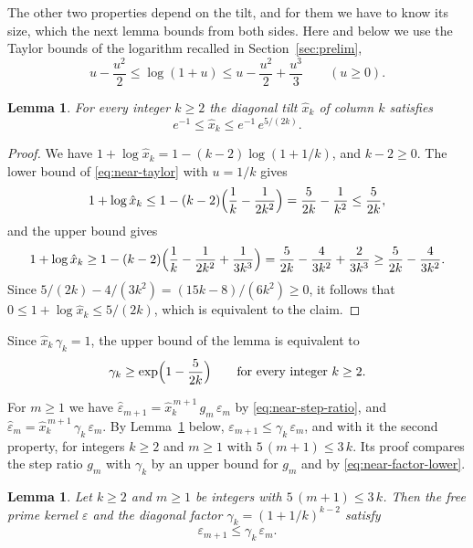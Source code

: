 \documentclass{amsart}
\newtheorem{lemma}[theorem]{Lemma}
\theoremstyle{definition}
\theoremstyle{remark}
\numberwithin{equation}{section}
\begin{document}
The other two properties depend on the tilt, and for them we have to know
its size, which the next lemma bounds from both sides.
Here and below we use the Taylor bounds of the logarithm recalled in
Section~\ref{sec:prelim},
\begin{equation}\label{eq:near-taylor}
u-\frac{u^2}{2}\le\log(1+u)\le u-\frac{u^2}{2}+\frac{u^3}{3}
\qquad(u\ge0).
\end{equation}

\begin{lemma}\label{lem:tiltbounds}
For every integer $k\ge2$ the diagonal tilt $\hat x_k$ of column $k$
satisfies
\[
e^{-1}\le\hat x_k\le e^{-1}\,e^{5/(2k)} .
\]
\end{lemma}

\begin{proof}
We have $1+\log\hat x_k=1-(k-2)\log(1+1/k)$, and $k-2\ge0$. The lower bound
of \eqref{eq:near-taylor} with $u=1/k$ gives
\[
1+\log\hat x_k\le1-(k-2)\Bigl(\frac1k-\frac{1}{2k^2}\Bigr)
=\frac{5}{2k}-\frac{1}{k^2}\le\frac{5}{2k} ,
\]
and the upper bound gives
\[
1+\log\hat x_k\ge1-(k-2)\Bigl(\frac1k-\frac{1}{2k^2}+\frac{1}{3k^3}\Bigr)
=\frac{5}{2k}-\frac{4}{3k^2}+\frac{2}{3k^3}\ge\frac{5}{2k}-\frac{4}{3k^2} .
\]
Since $5/(2k)-4/(3k^2)=(15k-8)/(6k^2)\ge0$, it follows that
$0\le1+\log\hat x_k\le5/(2k)$, which is equivalent to the claim.
\end{proof}

Since $\hat x_k\,\gamma_k=1$, the upper bound
of the lemma is equivalent to
\begin{equation}\label{eq:near-factor-lower}
\gamma_k\ge\exp\Bigl(1-\frac{5}{2k}\Bigr)
\qquad\text{for every integer }k\ge2 .
\end{equation}

For $m\ge1$ we have
$\hat\varepsilon_{m+1}=\hat x_k^{\,m+1}\,g_m\,\varepsilon_m$ by
\eqref{eq:near-step-ratio}, and
$\hat\varepsilon_m=\hat x_k^{\,m+1}\,\gamma_k\,\varepsilon_m$. By
Lemma~\ref{lem:kernelgrowth} below,
$\varepsilon_{m+1}\le\gamma_k\,\varepsilon_m$, and with it the second
property, for integers $k\ge2$ and $m\ge1$ with $5\,(m+1)\le3\,k$. Its proof
compares the step ratio $g_m$ with $\gamma_k$ by an upper bound for $g_m$
and by \eqref{eq:near-factor-lower}.

\begin{lemma}\label{lem:kernelgrowth}
Let $k\ge2$ and $m\ge1$ be integers with $5\,(m+1)\le3\,k$. Then the free
prime kernel $\varepsilon$ and the diagonal factor $\gamma_k=(1+1/k)^{k-2}$
satisfy
\[
\varepsilon_{m+1}\le\gamma_k\,\varepsilon_m .
\]
\end{lemma}
\end{document}
